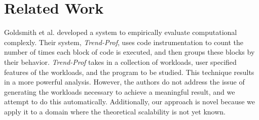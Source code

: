 \section{Related Work}


  Goldsmith et al. \cite{Goldsmith:2007:MEC:1287624.1287681} 
  developed a system to empirically evaluate computational
  complexly.  Their system, \textit{Trend-Prof}, uses code
  instrumentation to count the number of times each block 
  of code is executed, and then
  groups these blocks by their behavior.  \textit{Trend-Prof} takes in a
  collection of workloads, user specified features of the workloads, and
  the program to be studied. This technique results in a more powerful
  analysis. However, the authors do not address the
  issue of generating the workloads necessary to achieve a meaningful
  result, and we attempt to do this automatically.  Additionally, our
  approach is novel because we apply it to a domain where the
  theoretical scalability is not yet known.
